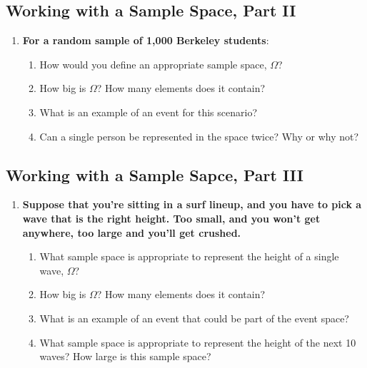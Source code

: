 \documentclass[
]{book}
\providecommand{\tightlist}{%
  \setlength{\itemsep}{0pt}\setlength{\parskip}{0pt}}
\theoremstyle{definition}
\theoremstyle{definition}
\theoremstyle{definition}
\theoremstyle{definition}
\theoremstyle{remark}
\begin{document}
\hypertarget{working-with-a-sample-space-part-ii}{%
\subsection{Working with a Sample Space, Part II}\label{working-with-a-sample-space-part-ii}}

\begin{enumerate}
\def\labelenumi{\arabic{enumi}.}
\setcounter{enumi}{1}
\tightlist
\item
  \textbf{For a random sample of 1,000 Berkeley students}:

  \begin{enumerate}
  \def\labelenumii{\arabic{enumii}.}
  \tightlist
  \item
    How would you define an appropriate sample space, \(\Omega\)?
  \item
    How big is \(\Omega\)? How many elements does it contain?
  \item
    What is an example of an event for this scenario?
  \item
    Can a single person be represented in the space twice? Why or why not?
  \end{enumerate}
\end{enumerate}

\hypertarget{working-with-a-sample-sapce-part-iii}{%
\subsection{Working with a Sample Sapce, Part III}\label{working-with-a-sample-sapce-part-iii}}

\begin{enumerate}
\def\labelenumi{\arabic{enumi}.}
\setcounter{enumi}{2}
\tightlist
\item
  \textbf{Suppose that you're sitting in a surf lineup, and you have to pick a wave that is the right height. Too small, and you won't get anywhere, too large and you'll get crushed.}

  \begin{enumerate}
  \def\labelenumii{\arabic{enumii}.}
  \tightlist
  \item
    What sample space is appropriate to represent the height of a single wave, \(\Omega\)?
  \item
    How big is \(\Omega\)? How many elements does it contain?
  \item
    What is an example of an event that could be part of the event space?
  \item
    What sample space is appropriate to represent the height of the next 10 waves? How large is this sample space?
  \end{enumerate}
\end{enumerate}
\end{document}
